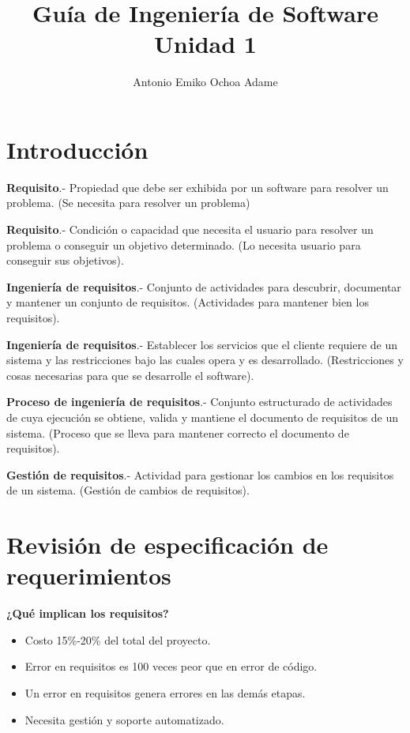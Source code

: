 \documentclass{article}
\begin{document}
\title{Guía de Ingeniería de Software Unidad 1}
\author{Antonio Emiko Ochoa Adame}
\maketitle

\section{Introducción}

\textbf{Requisito}.- Propiedad que debe ser exhibida por un software para
resolver un problema. (Se necesita para resolver un problema)

\vspace{1em}
\textbf{Requisito}.- Condición o capacidad que necesita el usuario para resolver
un problema o conseguir un objetivo determinado. (Lo necesita usuario para
conseguir sus objetivos).

\vspace{1em}
\textbf{Ingeniería de requisitos}.- Conjunto de actividades para descubrir,
documentar y mantener un conjunto de requisitos. (Actividades para mantener bien
los requisitos).

\vspace{1em}
\textbf{Ingeniería de requisitos}.- Establecer los servicios que el cliente
requiere de un sistema y las restricciones bajo las cuales opera y es desarrollado.
(Restricciones y cosas necesarias para que se desarrolle el software).

\vspace{1em}
\textbf{Proceso de ingeniería de requisitos}.- Conjunto estructurado de
actividades de cuya ejecución se obtiene, valida y mantiene el documento
de requisitos de un sistema. (Proceso que se lleva para mantener correcto el
documento de requisitos).

\vspace{1em}
\textbf{Gestión de requisitos}.- Actividad para gestionar los cambios en los
requisitos de un sistema. (Gestión de cambios de requisitos).

\section{Revisión de especificación de requerimientos}

\textbf{¿Qué implican los requisitos?}

\begin{itemize}
	\item
		Costo 15\%-20\% del total del proyecto.
	\item
		Error en requisitos es 100 veces peor que en error de código.
	\item
		Un error en requisitos genera errores en las demás etapas.
	\item
		Necesita gestión y soporte automatizado.
\end{itemize}
\end{document}

